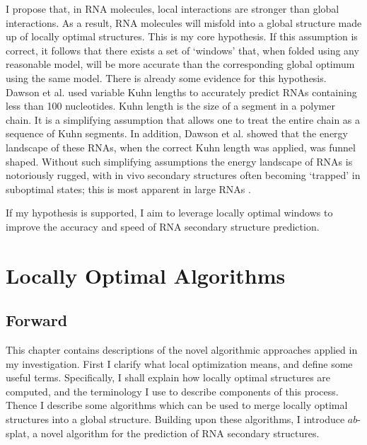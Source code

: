 \documentclass{cshonours}
\begin{document}
I propose that, in RNA molecules, local interactions are stronger than global interactions. As a result, RNA molecules will misfold into a global structure made up of locally optimal structures. This is my core hypothesis. If this assumption is correct, it follows that there exists a set of `windows' that, when folded using any reasonable model, will be more accurate than the corresponding global optimum using the same model. There is already some evidence for this hypothesis. Dawson et al. \cite{dawson2013new} used variable Kuhn lengths to accurately predict RNAs containing less than 100 nucleotides. Kuhn length is the size of a segment in a polymer chain. It is a simplifying assumption that allows one to treat the entire chain as a sequence of Kuhn segments. In addition, Dawson et al. showed that the energy landscape of these RNAs, when the correct Kuhn length was applied, was funnel shaped. Without such simplifying assumptions the energy landscape of RNAs is notoriously rugged, with in vivo secondary structures often becoming `trapped' in suboptimal states; this is most apparent in large RNAs \cite{ditzler2008rugged}.

If my hypothesis is supported, I aim to leverage locally optimal windows to improve the accuracy and speed of RNA secondary structure prediction.

\chapter{Locally Optimal Algorithms}

\section{Forward}
This chapter contains descriptions of the novel algorithmic approaches applied in my investigation. First I clarify what local optimization means, and define some useful terms. Specifically, I shall explain how locally optimal structures are computed, and the terminology I use to describe components of this process. Thence I describe some algorithms which can be used to merge locally optimal structures into a global structure. Building upon these algorithms, I introduce $ab$-splat, a novel algorithm for the prediction of RNA secondary structures.
\end{document}
